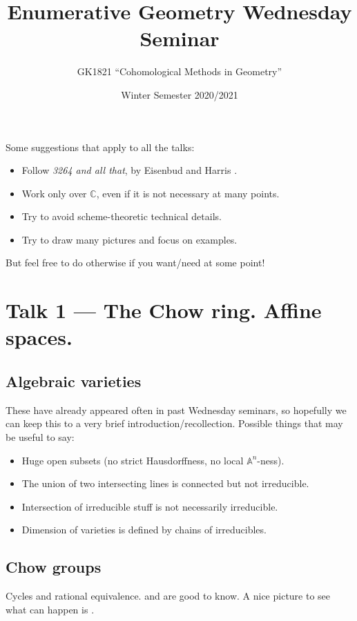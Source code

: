 \documentclass[A4paper, 12pt, british, reqno]{amsart}
\author{GK1821 ``Cohomological Methods in Geometry''}
\title[Enumerative Geometry Wednesday Seminar]{Enumerative Geometry Wednesday Seminar}
\date{Winter Semester 2020/2021}
\newcommand{\A}{\mathbb{A}} %
\newcommand{\C}{\mathbb{C}} %
\theoremstyle{plain}
\theoremstyle{definition}
\theoremstyle{remark}
\theoremstyle{plain}
\theoremstyle{definition}
\theoremstyle{remark}
\theoremstyle{plain}
\theoremstyle{definition}
\theoremstyle{remark}
\begin{document}

\maketitle

\tableofcontents

Some suggestions that apply to all the talks:
\begin{itemize}
    \item Follow \textit{3264 and all that}, by Eisenbud and Harris \cite{eh16}.
    \item Work only over $\C$, even if it is not necessary at many points.
    \item Try to avoid scheme-theoretic technical details.
    \item Try to draw many pictures and focus on examples.
\end{itemize}

But feel free to do otherwise if you want/need at some point!

\section{Talk 1 --- The Chow ring. Affine spaces.}

\subsection{Algebraic varieties}

These have already appeared often in past Wednesday seminars, so hopefully we can keep this to a very brief introduction/recollection.
Possible things that may be useful to say:
\begin{itemize}
    \item Huge open subsets (no strict Hausdorffness, no local $\A^{n}$-ness).
    \item The union of two intersecting lines is connected but not irreducible.
    \item Intersection of irreducible stuff is not necessarily irreducible.
    \item Dimension of varieties is defined by chains of irreducibles.
\end{itemize}

\subsection{Chow groups \cite[\S 1.2.1 and 1.2.2]{eh16}}
Cycles and rational equivalence.
\cite[Prop.~1.4]{eh16} and \cite[Prop.~1.10]{eh16} are good to know.
A nice picture to see what can happen is \cite[Fig.~1.2]{eh16}.
\end{document}
